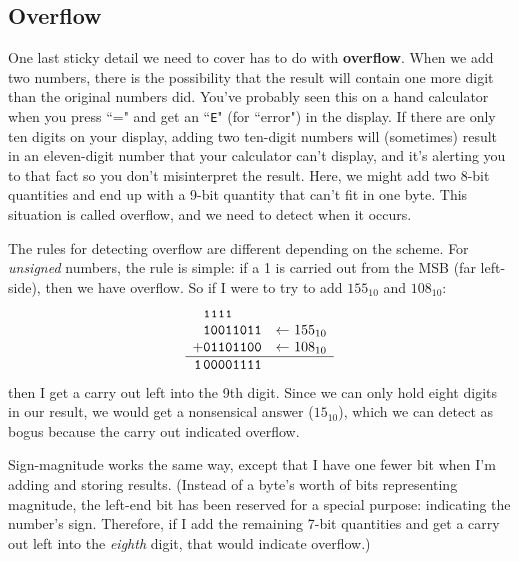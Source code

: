 \subsection{Overflow}

One last sticky detail we need to cover has to do with \textbf{overflow}.
When we add two numbers, there is the possibility that the result will
contain one more digit than the original numbers did. You've probably seen
this on a hand calculator when you press ``=" and get an ``\texttt{E}" (for
``error") in the display. If there are only ten digits on your display,
adding two ten-digit numbers will (sometimes) result in an eleven-digit
number that your calculator can't display, and it's alerting you to that
fact so you don't misinterpret the result. Here, we might add two 8-bit
quantities and end up with a 9-bit quantity that can't fit in one byte.
This situation is called overflow, and we need to detect when it occurs.

The rules for detecting overflow are different depending on the scheme.
For \textit{unsigned} numbers, the rule is simple: if a 1 is carried out
from the MSB (far left-side), then we have overflow. So if I were to try to
add $155_{10}$ and $108_{10}$:
\[
\begin{array}{*{9}{c@{\hspace{0pt}}}{l}}
  & \texttt{{\footnotesize 1}} & \texttt{{\footnotesize 1}} & \texttt{{\footnotesize 1}} & \texttt{{\footnotesize 1}} & & & & \\
  & \texttt{1} & \texttt{0} & \texttt{0} & \texttt{1} & \texttt{1} & \texttt{0} & \texttt{1} & \texttt{1} 
& \quad \textsl{$\leftarrow$ $155_{10}$}\\
+ & \texttt{0} & \texttt{1} & \texttt{1} & \texttt{0} & \texttt{1} & \texttt{1} & \texttt{0} & \texttt{0} 
& \quad \textsl{$\leftarrow$ $108_{10}$}\\
\hline
\texttt{1} & \texttt{0} & \texttt{0} & \texttt{0} & \texttt{0} & \texttt{1} & \texttt{1} & \texttt{1} & \texttt{1} \\
\end{array}
\]
then I get a carry out left into the 9th digit. Since we can only hold eight
digits in our result, we would get a nonsensical answer ($15_{10}$), which
we can detect as bogus because the carry out indicated overflow.

Sign-magnitude works the same way, except that I have one fewer bit when
I'm adding and storing results. (Instead of a byte's worth of bits
representing magnitude, the left-end bit has been reserved for a special
purpose: indicating the number's sign. Therefore, if I add the remaining
7-bit quantities and get a carry out left into the \textit{eighth} digit,
that would indicate overflow.)

